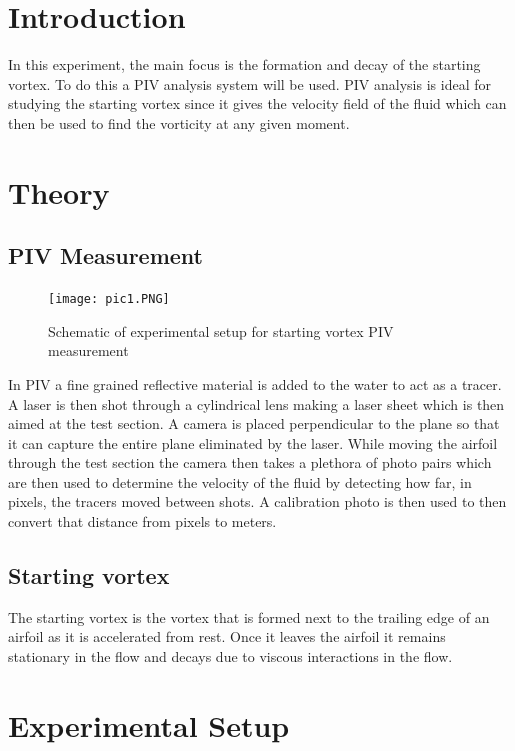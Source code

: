 \documentclass[12pt]{article}
\begin{document}
\newline
\newpage
\tableofcontents
\label{sec:Abstract}
\newpage

\section{Introduction}
In this experiment, the main focus is the formation and decay of the starting vortex. To do this a PIV analysis system will be used. PIV analysis is ideal for studying the starting vortex since it gives the velocity field of the fluid which can then be used to find the vorticity at any given moment.  

\newpage
\section{Theory}
\subsection{PIV Measurement}
    \begin{figure}[h]
    \texttt{[image: pic1.PNG]}
    \centering
    \caption{Schematic of experimental setup for starting vortex PIV measurement}
    \end{figure}
    In PIV a fine grained reflective material is added to the water to act as a tracer. A laser is then shot through a cylindrical lens making a laser sheet which is then aimed at the test section. A camera is placed perpendicular to the plane so that it can capture the entire plane eliminated by the laser. While moving the airfoil through the test section the camera then takes a plethora of photo pairs which are then used to determine the velocity of the fluid by detecting how far, in pixels, the tracers moved between shots. A calibration photo is then used to then convert that distance from pixels to meters.
\subsection{Starting vortex}
The starting vortex is the vortex that is formed next to the trailing edge of an airfoil as it is accelerated from rest. Once it leaves the airfoil it remains stationary in the flow and decays due to viscous interactions in the flow.


\newpage
\section{Experimental Setup}
\end{document}
